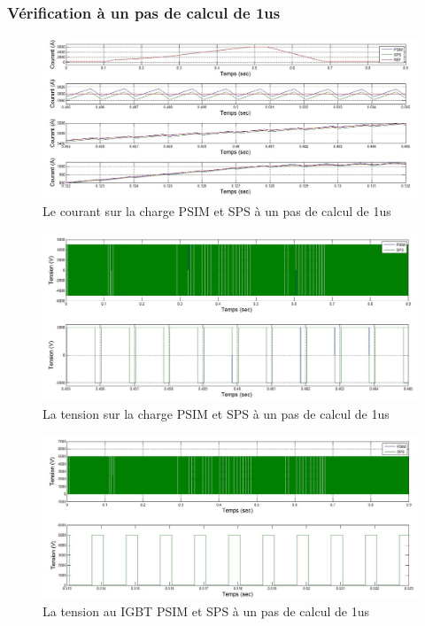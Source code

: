 \documentclass[11pt,letterpaper,final]{report}
\begin{document}
\subsubsection{Vérification à un pas de calcul de 1us}


\begin{figure}[h!]
\centering
\includegraphics[scale=0.5]{Fig/Hacheur4Quadrants/HacheurCourantCharge1u.jpg}
\caption{Le courant sur la charge PSIM et SPS à un pas de calcul de 1us}
\label{hc_cou_ch_1}
\end{figure}


\begin{figure}[h!]
\centering
\includegraphics[scale=0.5]{Fig/Hacheur4Quadrants/HacheurTensionCharge1u.jpg}
\caption{La tension sur la charge PSIM et SPS à un pas de calcul de 1us}
\label{hc_ten_ch_1}
\end{figure}


\begin{figure}[h!]
\centering
\includegraphics[scale=0.5]{Fig/Hacheur4Quadrants/HacheurTensionIGBT1u.jpg}
\caption{La tension au IGBT PSIM et SPS à un pas de calcul de 1us}
\label{hc_IG_ten_1}
\end{figure}
\end{document}
